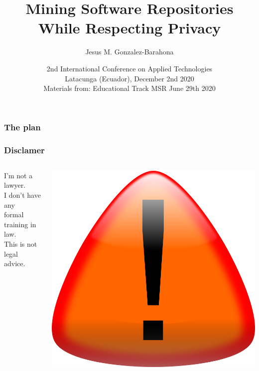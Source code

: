 \documentclass[17pt,aspectratio=169,hyperref={pdfusetitle,colorlinks,allcolors=olive}]{beamer}
\title[MSR \& Privacy]{Mining Software Repositories While Respecting Privacy}
\author[Jesus M. Gonzalez-Barahona]{Jesus M. Gonzalez-Barahona}
\institute[URJC]{Universidad Rey Juan Carlos \\
  @jgbarah ~~~~~ \url{https://jgbarah.github.io/presentations}}
\date[ICAT'20]{{\small 2nd International Conference on Applied Technologies \\
  Latacunga (Ecuador), December 2nd 2020 \\}
  {\footnotesize Materials from: Educational Track MSR June 29th 2020 \\}}
\begin{document}
\begin{frame}
  \maketitle
\end{frame}



\begin{frame}
  \frametitle{The plan}
\begin{multicols}{2}
\tableofcontents
\end{multicols}
\end{frame}


\begin{frame}[fragile]
  \frametitle{Disclamer}

\begin{columns}[T]
\begin{column}{.78\textwidth}
  {\Large
    I'm not a lawyer.\\
    \vspace{.8cm}
    I don't have any \\
    formal training in law.\\
    \vspace{.8cm}
    This is not legal advice.\\
  }
\end{column}%
\hfill%
\begin{column}{.20\textwidth}
    \includegraphics[height=\textwidth]{figs/signal-caution}
\end{column}%
\end{columns}
  
\end{frame}
\end{document}
